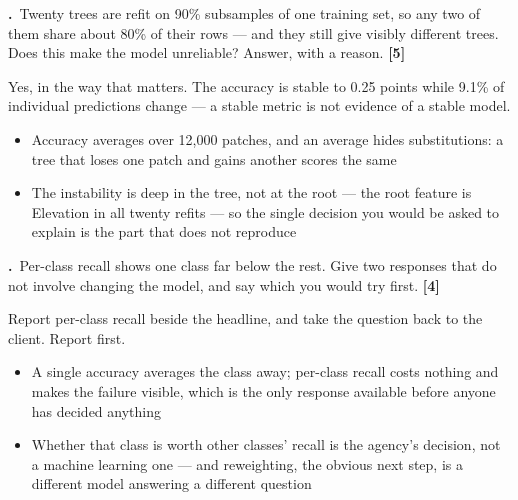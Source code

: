 \documentclass[11pt,a4paper]{article}
\newcounter{exq}[section]
\newcommand{\question}[2]{%
  \refstepcounter{exq}%
  \medskip
  \noindent
  \begin{minipage}{\textwidth}
    \textbf{\theexq.}~#1 \hfill{\color{aimlmuted}\textbf{[#2]}}
  \end{minipage}\par}
\begin{document}
\question{Twenty trees are refit on 90\% subsamples of one training set, so any two of them share about 80\% of their rows --- and they still give visibly different trees. Does this make the model unreliable? Answer, with a reason.}{5}
\begin{solution}[title={Solution}]
Yes, in the way that matters. The accuracy is stable to 0.25 points while 9.1\% of individual predictions change --- a stable metric is not evidence of a stable model.
\begin{itemize}[leftmargin=*,nosep]
  \item Accuracy averages over 12,000 patches, and an average hides substitutions: a tree that loses one patch and gains another scores the same
  \item The instability is deep in the tree, not at the root --- the root feature is Elevation in all twenty refits --- so the single decision you would be asked to explain is the part that does not reproduce
\end{itemize}
\end{solution}
\question{Per-class recall shows one class far below the rest. Give two responses that do not involve changing the model, and say which you would try first.}{4}
\begin{solution}[title={Solution}]
Report per-class recall beside the headline, and take the question back to the client. Report first.
\begin{itemize}[leftmargin=*,nosep]
  \item A single accuracy averages the class away; per-class recall costs nothing and makes the failure visible, which is the only response available before anyone has decided anything
  \item Whether that class is worth other classes' recall is the agency's decision, not a machine learning one --- and reweighting, the obvious next step, is a different model answering a different question
\end{itemize}
\end{solution}
\end{document}
